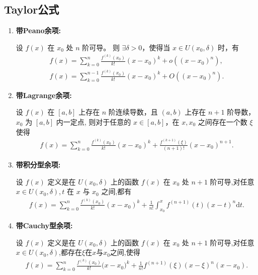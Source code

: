 \documentclass[../../main.tex]{subfiles}%
\begin{document}
\subsection{Taylor公式}

\begin{theorem}[Taylor定理]\label{theorem:带各种余项的Taylor公式}
\begin{enumerate}[(1)]
\item \textbf{带Peano余项:}

设 $f(x)$ 在 $x_0$ 处 $n$ 阶可导。
则 $\exists \delta > 0$，使得当 $x \in U(x_0, \delta)$ 时，有
\begin{gather*}
f\left( x \right) =\sum_{k=0}^n{\frac{f^{\left( k \right)}\left( x_0 \right)}{k!}\left( x-x_0 \right) ^k}+o\left( \left( x-x_0 \right) ^n \right) ,
\\
f\left( x \right) =\sum_{k=0}^{n-1}{\frac{f^{\left( k \right)}\left( x_0 \right)}{k!}\left( x-x_0 \right) ^k}+O\left( \left( x-x_0 \right) ^n \right) .
\end{gather*}

\item \textbf{带Lagrange余项:}

设 $f(x)$ 在 $[a, b]$ 上存在 $n$ 阶连续导数，且 $(a, b)$ 上存在 $n + 1$ 阶导数，$x_0$ 为 $[a, b]$ 内一定点,
则对于任意的 $x \in [a, b]$，在 $x, x_0$ 之间存在一个数 $\xi$ 使得
\begin{align*}
f(x) = \sum_{k=0}^{n} \frac{f^{(k)}(x_0)}{k!} (x - x_0)^k + \frac{f^{(k+1)}(\xi)}{(n + 1)!} (x - x_0)^{n+1}.
\end{align*}

\item \textbf{带积分型余项:}

设 $f(x)$ 定义是在 $U(x_0, \delta)$ 上的函数 $f(x)$ 在 $x_0$ 处 $n + 1$ 阶可导,对任意$x\in U(x_0, \delta)$,$\,t$ 在 $x$ 与 $x_0$ 之间,都有
\begin{align*}
f(x) = \sum_{k=0}^{n} \frac{f^{(k)}(x_0)}{k!} (x - x_0)^k + \frac{1}{n!} \int_{x_0}^{x} f^{(n+1)}(t) (x - t)^n \mathrm{d}t.
\end{align*}

\item \textbf{带Cauchy型余项:}

设 $f(x)$ 定义是在 $U(x_0, \delta)$ 上的函数 $f(x)$ 在 $x_0$ 处 $n + 1$ 阶可导,对任意$x\in U(x_0, \delta)$,都存在$\xi$在$x$与$x_0$之间,使得
\begin{align*}
f(x)=\sum_{k=0}^n{\frac{f^{(k)}(x_0)}{k!}(x}-x_0)^k+\frac{1}{n!}f^{\left( n+1 \right)}\left( \xi \right) \left( x-\xi \right) ^n\left( x-x_0 \right) .
\end{align*}
\end{enumerate}
\end{theorem}
\end{document}

